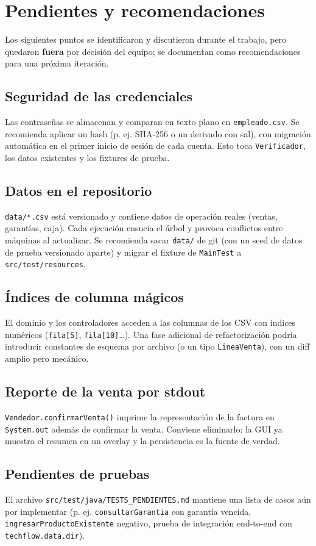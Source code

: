 \chapter{Pendientes y recomendaciones}

Los siguientes puntos se identificaron y discutieron durante el trabajo, pero quedaron \textbf{fuera} por decisión del equipo; se documentan como recomendaciones para una próxima iteración.

\section{Seguridad de las credenciales}
Las contraseñas se almacenan y comparan en texto plano en \texttt{empleado.csv}. Se recomienda aplicar un hash (p. ej. SHA-256 o un derivado con sal), con migración automática en el primer inicio de sesión de cada cuenta. Esto toca \texttt{Verificador}, los datos existentes y los fixtures de prueba.

\section{Datos en el repositorio}
\texttt{data/*.csv} está versionado y contiene datos de operación reales (ventas, garantías, caja). Cada ejecución ensucia el árbol y provoca conflictos entre máquinas al actualizar. Se recomienda sacar \texttt{data/} de git (con un seed de datos de prueba versionado aparte) y migrar el fixture de \texttt{MainTest} a \texttt{src/test/resources}.

\section{Índices de columna mágicos}
El dominio y los controladores acceden a las columnas de los CSV con índices numéricos (\texttt{fila[5]}, \texttt{fila[10]}\ldots). Una fase adicional de refactorización podría introducir constantes de esquema por archivo (o un tipo \texttt{LineaVenta}), con un diff amplio pero mecánico.

\section{Reporte de la venta por stdout}
\texttt{Vendedor.confirmarVenta()} imprime la representación de la factura en \texttt{System.out} además de confirmar la venta. Conviene eliminarlo: la GUI ya muestra el resumen en un overlay y la persistencia es la fuente de verdad.

\section{Pendientes de pruebas}
El archivo \texttt{src/test/java/TESTS\_PENDIENTES.md} mantiene una lista de casos aún por implementar (p. ej. \texttt{consultarGarantia} con garantía vencida, \texttt{ingresarProductoExistente} negativo, prueba de integración end-to-end con \texttt{techflow.data.dir}).
